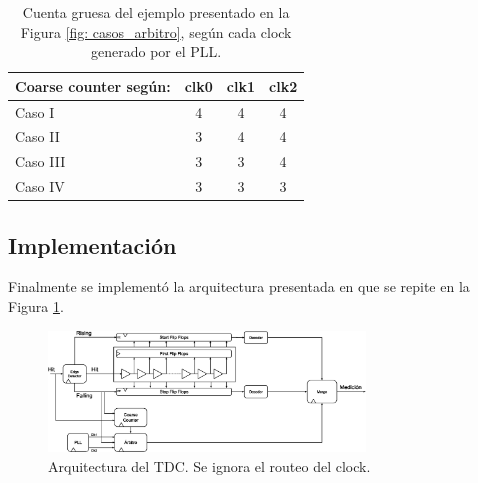 \begin{table}[H]
     \centering
     \begin{tabular}{|l|c|c|c|}
     \hline
     Coarse counter según: & clk0 & clk1 & clk2 \\ \hline
     Caso I                & 4    & 4    & 4    \\ \hline
     Caso II               & 3    & 4    & 4    \\ \hline
     Caso III              & 3    & 3    & 4    \\ \hline
     Caso IV               & 3    & 3    & 3    \\ \hline
     \end{tabular}
     \caption{Cuenta gruesa del ejemplo presentado en la Figura \ref{fig: casos_arbitro}, según cada clock generado por el PLL.}
     \label{tabla: arbitro}
\end{table}


\subsection{Implementación}
Finalmente se implementó la arquitectura presentada en \cite{machado_novel_2018} que se repite en la Figura \ref{fig: TDC}.
\begin{figure}[H]
     \centering
     \includegraphics[width=0.75\textwidth]{imagenes/arq_tdc.eps}
     \caption{Arquitectura del TDC. Se ignora el routeo del clock.}
     \label{fig: TDC}
\end{figure}